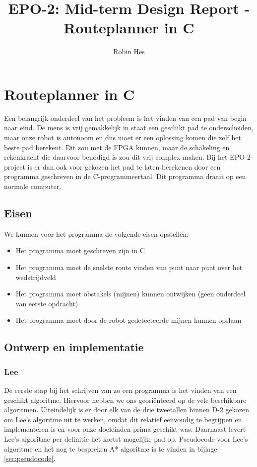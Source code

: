 \documentclass{report}
\title{EPO-2: Mid-term Design Report - Routeplanner in C}
\author{Robin Hes}
\begin{document}
\chapter{Routeplanner in C}
\label{ch:route}

Een belangrijk onderdeel van het probleem is het vinden van een pad van begin naar eind.
De mens is vrij gemakkelijk in staat een geschikt pad te onderscheiden, maar onze robot is autonoom en dus moet er een oplossing komen die zelf het beste pad berekent.
Dit zou met de FPGA kunnen, maar de schakeling en rekenkracht die daarvoor benodigd is zou dit vrij complex maken.
Bij het EPO-2-project is er dan ook voor gekozen het pad te laten berekenen door een programma geschreven in de C-programmeertaal.
Dit programma draait op een normale computer.

\section{Eisen}
\label{route-eisen}

We kunnen voor het programma de volgende eisen opstellen:

\begin{itemize}
	\item Het programma moet geschreven zijn in C
	\item Het programma moet de snelste route vinden van punt naar punt over het wedstrijdveld
	\item Het programma moet obstakels (mijnen) kunnen ontwijken (geen onderdeel van eerste opdracht)
	\item Het programma moet door de robot gedetecteerde mijnen kunnen opslaan
\end{itemize}

\section{Ontwerp en implementatie}
\label{sec:ontwerp-impl}

\subsection{Lee}
\label{ssec:lee}

De eerste stap bij het schrijven van zo een programma is het vinden van een geschikt algoritme.
Hiervoor hebben we ons georiënteerd op de vele beschikbare algoritmen.
Uiteindelijk is er door elk van de drie tweetallen binnen D-2 gekozen om Lee's algoritme uit te werken, omdat dit relatief eenvoudig te begrijpen en implementeren is en voor onze doeleinden prima geschikt was.
Daarnaast levert Lee's algoritme per definitie het kortst mogelijke pad op.
Pseudocode voor Lee's algoritme en het nog te bespreken A* algoritme is te vinden in bijlage \ref{sec:pseudocode}.
\end{document}
